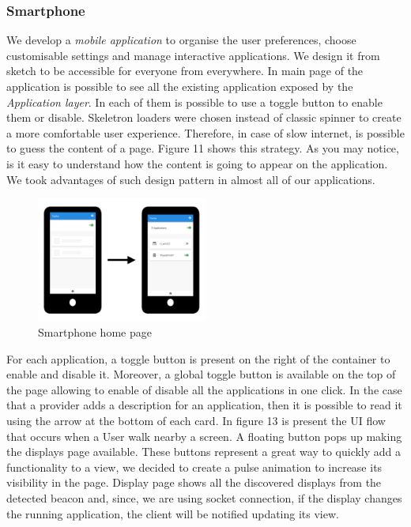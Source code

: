 \documentclass[]{usiinfbachelorproject}
\begin{document}
\subsubsection{Smartphone}
We develop a \emph{mobile application} to organise the user preferences, choose customisable settings and manage interactive applications. We design it from sketch to be accessible for everyone from everywhere. In main page of the application is possible to see all the existing application exposed by the \emph{Application layer}. In each of them is possible to use a toggle button to enable them or disable. Skeletron loaders were chosen instead of classic spinner to create a more comfortable user experience. Therefore, in case of slow internet, is possible to guess the content of a page. Figure 11 shows this strategy. As you may notice, is it easy to understand how the content is going to appear on the application. We took advantages of such design pattern in almost all of our applications.
\begin{figure}[H]
\centering
\includegraphics[width=0.5\textwidth]{./images/smartphone_loading_applications}
\caption{Smartphone home page}
\end{figure}
For each application, a toggle button is present on the right of the container to enable and disable it. Moreover, a global toggle button is available on the top of the page allowing to enable of disable all the applications in one click. In the case that a provider adds a description for an application, then it is possible to read it using the arrow at the bottom of each card.
In figure 13 is present the UI flow that occurs when a User walk nearby a screen. A floating button pops up making the displays page available. These buttons represent a great way to quickly add a functionality to a view, we decided to create a pulse animation to increase its visibility in the page. Display page shows all the discovered displays from the detected beacon and, since, we are using socket connection, if the display changes the running application, the client will be notified updating its view.
\end{document}
